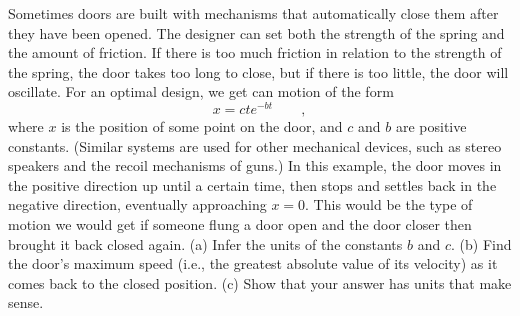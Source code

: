 Sometimes doors are built with mechanisms that automatically close them after
they have been opened. The designer can set both the strength of the spring
and the amount of friction. If there is too much friction in relation to the strength of the spring, the door takes
too long to close, but if there is too little, the door will oscillate.
For an optimal design, we get can motion of the form
\begin{equation*}
 x=ct e^{-bt} \qquad ,
\end{equation*}
 where $x$ is the position of some point on the door,
and $c$ and $b$ are positive constants. (Similar systems are used for other mechanical devices, such as stereo
speakers and the recoil mechanisms of guns.) In this example, the door moves in the positive direction up until
a certain time, then stops and settles back in the negative direction, eventually approaching $x=0$. This would be
the type of motion we would get if someone flung a door open and the door closer then brought it back closed again.
(a) Infer the units of the constants $b$ and $c$.\hwendpart
(b) Find the door's maximum speed (i.e., the greatest absolute value of its velocity) as it 
comes back to the closed position.\answercheck\hwendpart
(c) Show that your answer has units that make sense.
